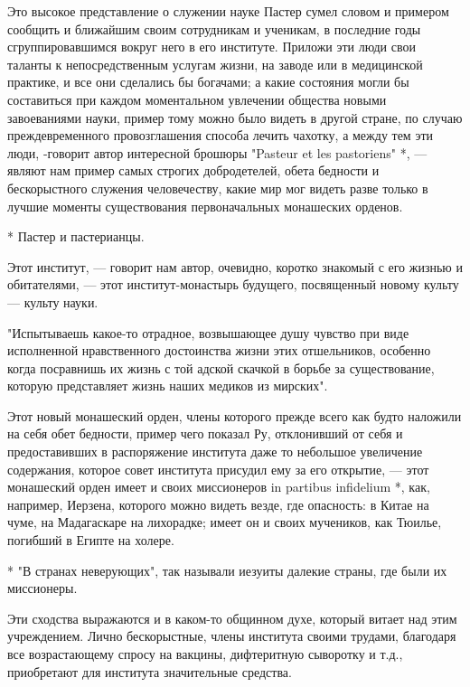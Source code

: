Это  высокое  представление  о  служении  науке  Пастер  сумел  словом
и  примером  сообщить и  ближайшим  своим  сотрудникам и  ученикам,  в
последние годы сгруппировавшимся вокруг  него в его институте. Приложи
эти люди свои таланты к  непосредственным услугам жизни, на заводе или
в  медицинской практике,  и все  они  сделались бы  богачами; а  какие
состояния  могли  бы  составиться при  каждом  моментальном  увлечении
общества новыми  завоеваниями науки, пример  тому можно было  видеть в
другой  стране,  по  случаю  преждевременного  провозглашения  способа
лечить  чахотку,  а между  тем  эти  люди, -говорит  автор  интересной
брошюры  "Pasteur  et  les  pastoriens"   *,  ---  являют  нам  пример
самых строгих  добродетелей, обета  бедности и  бескорыстного служения
человечеству,  какие мир  мог  видеть разве  только  в лучшие  моменты
существования первоначальных монашеских орденов.

* Пастер и пастерианцы.

Этот институт,  --- говорит  нам автор,  очевидно, коротко  знакомый с
его  жизнью  и  обитателями,  ---  этот  институт-монастырь  будущего,
посвященный новому культу --- культу науки.

"Испытываешь  какое-то отрадное,  возвышающее  душу  чувство при  виде
исполненной нравственного достоинства жизни этих отшельников, особенно
когда  посравнишь  их   жизнь  с  той  адской  скачкой   в  борьбе  за
существование, которую представляет жизнь наших медиков из мирских".

Этот новый  монашеский орден,  члены которого  прежде всего  как будто
наложили на себя обет бедности, пример чего показал Ру, отклонивший от
себя  и  предоставивших в  распоряжение  института  даже то  небольшое
увеличение  содержания, которое  совет института  присудил ему  за его
открытие,  --- этот  монашеский  орден имеет  и  своих миссионеров  in
partibus infidelium  *, как, например, Иерзена,  которого можно видеть
везде, где  опасность: в Китае  на чуме, на Мадагаскаре  на лихорадке;
имеет он и своих мучеников, как Тюилье, погибший в Египте на холере.

* "В  странах неверующих",  так называли  иезуиты далекие  страны, где
были их миссионеры.

Эти сходства выражаются и в каком-то общинном духе, который витает над
этим учреждением. Лично бескорыстные,  члены института своими трудами,
благодаря все возрастающему спросу на вакцины, дифтеритную сыворотку и
т.д., приобретают для института значительные средства.

